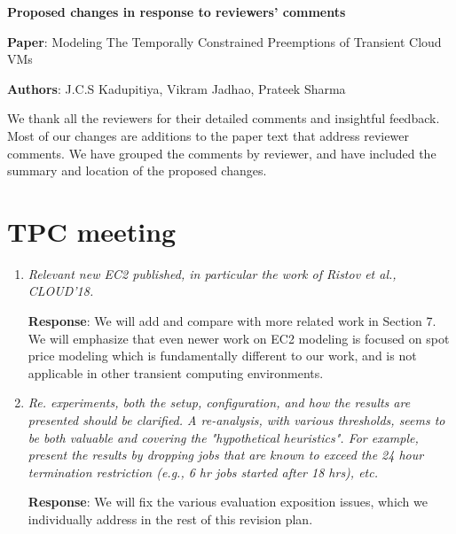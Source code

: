 \documentclass{article}
\newcommand{\resp}[1]{\textbf{Response}: #1}
\newcommand{\revmade}[1]{\textbf{Revision Made}: #1}
\begin{document}
\begin{center}
  \large{\textbf {Proposed changes in response to reviewers'
      comments}}

{\textbf{Paper}:  Modeling The Temporally Constrained Preemptions of Transient Cloud VMs}

{\textbf{Authors}: J.C.S Kadupitiya, Vikram Jadhao, Prateek Sharma}
\end{center}

\date{April 1 2020}

We thank all the reviewers for their detailed comments and insightful feedback.
Most of our changes are additions to the paper text that address reviewer comments. 
We have grouped the comments by reviewer, and have included the summary and location of the proposed changes.


\section{TPC meeting}

\begin{enumerate}

\item \emph{Relevant new EC2 published, in particular the work of Ristov et al., CLOUD'18.}

\resp{We will add and compare with more related work in Section 7. We will emphasize that even newer work on EC2 modeling is focused on spot price modeling which is fundamentally different to our work, and is not applicable in other transient computing environments.}


\item \emph{Re. experiments, both the setup, configuration, and how the results are presented should be clarified. A re-analysis, with various thresholds, seems to be both valuable and covering the "hypothetical heuristics". For example, present the results by dropping jobs that are known to exceed the 24 hour termination restriction (e.g., 6 hr jobs started after 18 hrs), etc.}

\resp{We will fix the various evaluation exposition issues, which we individually address in the rest of this revision plan.}



\end{enumerate}
\end{document}
